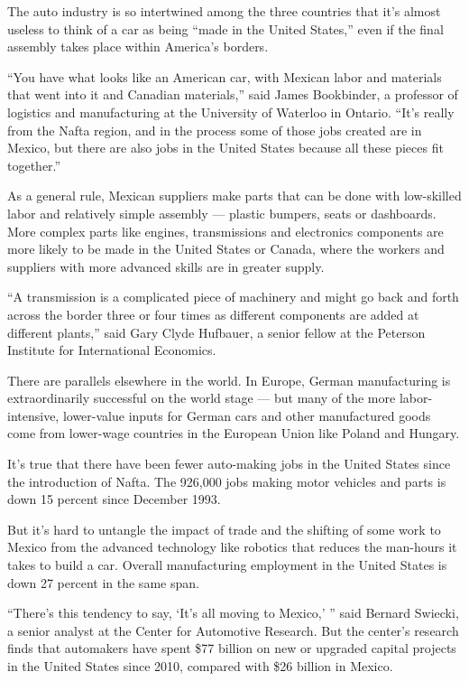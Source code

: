 The auto industry is so intertwined among the three countries that it's
almost useless to think of a car as being ``made in the United States,''
even if the final assembly takes place within America's borders.

``You have what looks like an American car, with Mexican labor and
materials that went into it and Canadian materials,'' said James
Bookbinder, a professor of logistics and manufacturing at the University
of Waterloo in Ontario. ``It's really from the Nafta region, and in the
process some of those jobs created are in Mexico, but there are also
jobs in the United States because all these pieces fit together.''

As a general rule, Mexican suppliers make parts that can be done with
low-skilled labor and relatively simple assembly --- plastic bumpers,
seats or dashboards. More complex parts like engines, transmissions and
electronics components are more likely to be made in the United States
or Canada, where the workers and suppliers with more advanced skills are
in greater supply.

``A transmission is a complicated piece of machinery and might go back
and forth across the border three or four times as different components
are added at different plants,'' said Gary Clyde Hufbauer, a senior
fellow at the Peterson Institute for International Economics.

There are parallels elsewhere in the world. In Europe, German
manufacturing is extraordinarily successful on the world stage --- but
many of the more labor-intensive, lower-value inputs for German cars and
other manufactured goods come from lower-wage countries in the European
Union like Poland and Hungary.

It's true that there have been fewer auto-making jobs in the United
States since the introduction of Nafta. The 926,000 jobs making motor
vehicles and parts is down 15 percent since December 1993.

But it's hard to untangle the impact of trade and the shifting of some
work to Mexico from the advanced technology like robotics that reduces
the man-hours it takes to build a car. Overall manufacturing employment
in the United States is down 27 percent in the same span.

``There's this tendency to say, `It's all moving to Mexico,' '' said
Bernard Swiecki, a senior analyst at the Center for Automotive Research.
But the center's research finds that automakers have spent \$77 billion
on new or upgraded capital projects in the United States since 2010,
compared with \$26 billion in Mexico.

